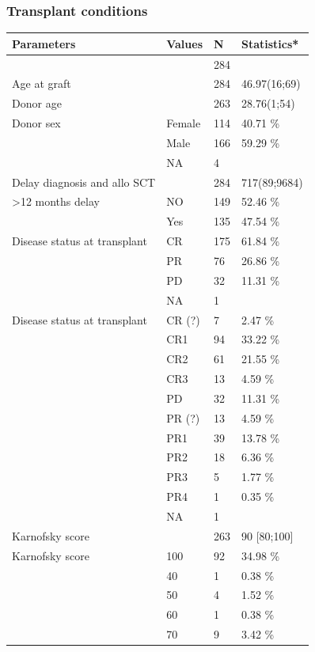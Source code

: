 \documentclass[a4paper,11pt] {article}
\begin{document}
 \subsubsection{Transplant conditions}
\begin{longtable}{llll}
  \hline
Parameters & Values & N & Statistics* \\ 
  \hline
 &  & 284 &  \\ 
  Age at graft &  & 284 & 46.97(16;69) \\ 
  Donor age &  & 263 & 28.76(1;54) \\ 
  Donor sex & Female & 114 & 40.71 \% \\ 
   & Male & 166 & 59.29 \% \\ 
   & NA & 4 &  \\ 
  Delay diagnosis and allo SCT &  & 284 & 717(89;9684) \\ 
  >12 months delay & NO & 149 & 52.46 \% \\ 
   & Yes & 135 & 47.54 \% \\ 
  Disease status at transplant & CR & 175 & 61.84 \% \\ 
   & PR & 76 & 26.86 \% \\ 
   & PD & 32 & 11.31 \% \\ 
   & NA & 1 &  \\ 
  Disease status at transplant & CR (?) & 7 & 2.47 \% \\ 
   & CR1 & 94 & 33.22 \% \\ 
   & CR2 & 61 & 21.55 \% \\ 
   & CR3 & 13 & 4.59 \% \\ 
   & PD & 32 & 11.31 \% \\ 
   & PR (?) & 13 & 4.59 \% \\ 
   & PR1 & 39 & 13.78 \% \\ 
   & PR2 & 18 & 6.36 \% \\ 
   & PR3 & 5 & 1.77 \% \\ 
   & PR4 & 1 & 0.35 \% \\ 
   & NA & 1 &  \\ 
  Karnofsky score &  & 263 & 90 [80;100] \\ 
  Karnofsky score & 100 & 92 & 34.98 \% \\ 
   & 40 & 1 & 0.38 \% \\ 
   & 50 & 4 & 1.52 \% \\ 
   & 60 & 1 & 0.38 \% \\ 
   & 70 & 9 & 3.42 \% \\ 

\end{longtable}
\end{document}
